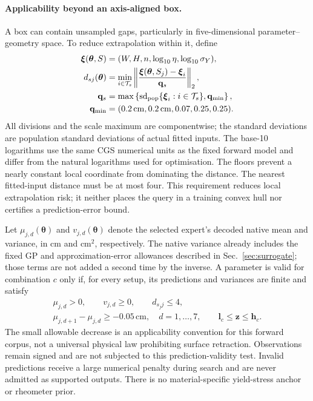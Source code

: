 \paragraph{Applicability beyond an axis-aligned box.}
A box can contain unsampled gaps, particularly in five-dimensional
parameter--geometry space. To reduce extrapolation within it, define
\begin{equation}
\label{eq:inverse-support-distance}
\begin{aligned}
 \boldsymbol\xi(\boldsymbol\theta,S)
   &=(W,H,n,\log_{10}\eta,\log_{10}\sigma_Y),\\
 d_{sj}(\boldsymbol\theta)
   &=\min_{i\in\mathcal T_s}
      \left\|\frac{\boldsymbol\xi(\boldsymbol\theta,S_j)
                         -\boldsymbol\xi_i}{\mathbf q_s}\right\|_2,\\
 \mathbf q_s&=\max\left\{
  \operatorname{sd}_{\rm pop}\{\boldsymbol\xi_i:i\in\mathcal T_s\},
  \mathbf q_{\min}\right\},\\
 \mathbf q_{\min}&=(0.2\,\mathrm{cm},0.2\,\mathrm{cm},0.07,0.25,0.25).
\end{aligned}
\end{equation}
All divisions and the scale maximum are componentwise; the standard
deviations are population standard deviations of actual fitted inputs.
The base-10 logarithms use the same CGS numerical units as the fixed
forward model and differ from the natural logarithms used for optimisation.
The floors prevent a nearly constant local coordinate from dominating the
distance. The nearest fitted-input distance must be at most four.
This requirement reduces local extrapolation risk; it neither places the
query in a training convex hull nor certifies a prediction-error bound.

Let $\mu_{j,d}(\boldsymbol\theta)$ and
$v_{j,d}(\boldsymbol\theta)$ denote the selected expert's decoded native
mean and variance, in cm and $\mathrm{cm}^2$, respectively. The native
variance already includes the fixed GP and approximation-error allowances
described in Sec.~\ref{sec:surrogate}; those terms are not added a second
time by the inverse. A parameter is valid for combination $c$ only if,
for every setup, its predictions and variances are finite and satisfy
\begin{equation}
\label{eq:inverse-validity}
\begin{gathered}
 \mu_{j,d}>0,\qquad v_{j,d}\geq0,\qquad d_{s_jj}\leq4,\\
 \mu_{j,d+1}-\mu_{j,d}\geq-0.05\,\mathrm{cm},\quad d=1,\ldots,7,
 \qquad\mathbf l_c\leq\mathbf z\leq\mathbf h_c.
\end{gathered}
\end{equation}
The small allowable decrease is an applicability convention for this
forward corpus, not a universal physical law prohibiting surface
retraction. Observations remain signed and are not subjected to this
prediction-validity test. Invalid predictions receive a large numerical
penalty during search and are never admitted as supported outputs.
\label{sec:inv-sy}
There is no material-specific yield-stress anchor or rheometer prior.

